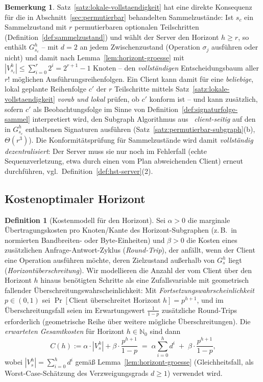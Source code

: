 ﻿\documentclass[a4paper,12pt]{article}
\theoremstyle{definition}
\newtheorem{definition}{Definition}
\newtheorem{bemerkung}{Bemerkung}
\begin{document}
\begin{bemerkung}
	\label{bem:hst-permutierbar}
	Satz~\ref{satz:lokale-vollstaendigkeit} hat eine direkte Konsequenz für die in
	Abschnitt~\ref{sec:permutierbar} behandelten Sammelzustände: Ist $s_c$ ein
	Sammelzustand mit $r$ permutierbaren optionalen Teilschritten
	(Definition~\ref{def:sammelzustand}) und wählt der Server den Horizont $h\ge r$, so
	enthält $G_{s_c}^h$ -- mit $d=2$ an jedem Zwischenzustand (Operation $\sigma_j$
	ausführen oder nicht) und damit nach Lemma~\ref{lem:horizont-groesse} mit
	$|V_{s_c}^h|\le\sum_{i=0}^r 2^i=2^{r+1}-1$ Knoten -- den \emph{vollständigen}
	Entscheidungsbaum aller $r!$ möglichen Ausführungsreihenfolgen. Ein Client kann damit
	für eine \emph{beliebige}, lokal geplante Reihenfolge $c'$ der $r$ Teilschritte
	mittels Satz~\ref{satz:lokale-vollstaendigkeit} \emph{vorab und lokal} prüfen, ob
	$c'$ konform ist -- und kann zusätzlich, sofern $c'$ als Beobachtungsfolge im Sinne
	von Definition~\ref{def:signaturfolge-sammel} interpretiert wird, den Subgraph
	Algorithmus aus~\cite{epp2026subgraph} \emph{client-seitig} auf den in $G_{s_c}^h$
	enthaltenen Signaturen ausführen (Satz~\ref{satz:permutierbar-subgraph}(b),
	$\Theta(r^3)$). Die Konformitätsprüfung für Sammelzustände wird damit
	\emph{vollständig dezentralisiert}: Der Server muss sie nur noch im Fehlerfall (echte
	Sequenzverletzung, etwa durch einen vom Plan abweichenden Client) erneut
	durchführen, vgl.\ Definition~\ref{def:hst-server}(2).
\end{bemerkung}
\subsection{Kostenoptimaler Horizont}
\label{sec:hst-kosten}

\begin{definition}[Kostenmodell für den Horizont]
	\label{def:kostenmodell-horizont}
	Sei $\alpha>0$ die marginale Übertragungskosten pro Knoten/Kante des
	Horizont-Subgraphen (z.\,B.\ in normierten Bandbreiten- oder Byte-Einheiten) und
	$\beta>0$ die Kosten eines zusätzlichen Anfrage-Antwort-Zyklus
	(\emph{Round-Trip}), der anfällt, wenn der Client eine Operation ausführen möchte,
	deren Zielzustand außerhalb von $G_s^h$ liegt (\emph{Horizontüberschreitung}). Wir
	modellieren die Anzahl der vom Client über den Horizont $h$ hinaus benötigten
	Schritte als eine Zufallsvariable mit geometrisch fallender Überschreitungswahrscheinlichkeit:
	Mit \emph{Fortsetzungswahrscheinlichkeit} $p\in(0,1)$ sei
	$\Pr[\text{Client überschreitet Horizont }h] = p^{h+1}$, und im Überschreitungsfall
	seien im Erwartungswert $\frac{1}{1-p}$ zusätzliche Round-Trips erforderlich
	(geometrische Reihe über weitere mögliche Überschreitungen). Die \emph{erwarteten
	Gesamtkosten} für Horizont $h\in\mathbb{N}_0$ sind dann
	\[
		C(h) := \alpha\cdot|V_s^h| + \beta\cdot\frac{p^{h+1}}{1-p}
		     \;=\; \alpha\sum_{i=0}^{h} d^i \;+\; \beta\cdot\frac{p^{h+1}}{1-p},
	\]
	wobei $|V_s^h|=\sum_{i=0}^h d^i$ gemäß Lemma~\ref{lem:horizont-groesse}
	(Gleichheitsfall, als Worst-Case-Schätzung des Verzweigungsgrads $d\ge1$) verwendet
	wird.
\end{definition}
\end{document}
